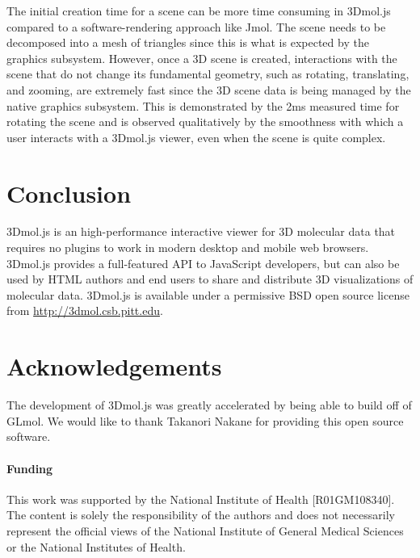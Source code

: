 \documentclass[]{bioinfo}
\begin{document}
The initial creation time for a scene can be more time consuming in 3Dmol.js compared to a software-rendering approach like Jmol.
 The scene needs to be decomposed into a mesh of triangles since this is what is expected
by the graphics subsystem.  However, once a 3D scene is created, interactions with the scene that do not change its fundamental geometry,
such as rotating, translating, and zooming, are extremely fast since the 3D scene data is being managed by the native graphics subsystem.
This is demonstrated by the 2ms measured time for rotating the scene and is observed qualitatively by the smoothness with which a user 
 interacts with a 3Dmol.js viewer, even when the scene is quite complex. 

\section{Conclusion}
3Dmol.js is an high-performance interactive viewer for 3D molecular data that requires no plugins to work in modern desktop and mobile web browsers.
3Dmol.js provides a full-featured API to JavaScript developers, but can also be used by HTML authors and end users to share and distribute
3D visualizations of molecular data. 3Dmol.js is available under a permissive BSD open source license from \url{http://3dmol.csb.pitt.edu}.
 
\section*{Acknowledgements}
The development of 3Dmol.js was greatly accelerated by being able to build off of GLmol.  We
would like to thank Takanori Nakane for providing this open source software.

\paragraph{Funding\textcolon} 
This work was supported by the National Institute of Health [R01GM108340].
The content is solely the responsibility of the authors and does not necessarily
represent the official views of the National Institute of General Medical Sciences
or the National Institutes of Health.



\end{document}
